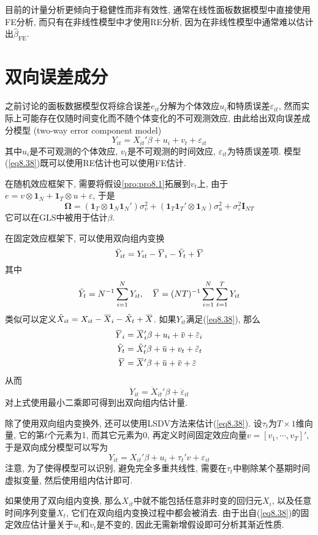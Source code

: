 \documentclass[cn, 12pt, math=mtpro2, bibstyle=apa, blue, twocol]{elegantbook}
\newcommand{\hb}{\hat{\beta}}
\newcommand{\OX}{\overbar{X}}
\newcommand{\BO}{\mathbold{\Omega}}
\newcommand{\overbar}[1]{\mkern 1.5mu\overline{\mkern-1.5mu#1\mkern-1.5mu}\mkern 1.5mu}
\begin{document}
目前的计量分析更倾向于稳健性而非有效性, 通常在线性面板数据模型中直接使用FE分析, 而只有在非线性模型中才使用RE分析, 因为在非线性模型中通常难以估计出$\hb_{\text{FE}}$.
\section{双向误差成分}
之前讨论的面板数据模型仅将综合误差$e_{it}$分解为个体效应$u_i$和特质误差$\varepsilon_{it}$, 然而实际上可能存在仅随时间变化而不随个体变化的不可观测效应, 由此给出双向误差成分模型 (two-way error component model)
\begin{equation}\label{eq8.38}
  Y_{it}=X_{it}'\beta+u_i+v_t+\varepsilon_{it}
\end{equation}
其中$u_i$是不可观测的个体效应, $v_t$是不可观测的时间效应, $\varepsilon_{it}$为特质误差项. 模型(\ref{eq8.38})既可以使用RE估计也可以使用FE估计.

在随机效应框架下, 需要将假设\ref{pro:pro8.1}拓展到$v_t$上, 由于$e=v\otimes \mathbf{1}_N+\mathbf{1}_T\otimes u+\varepsilon$, 于是
$$\BO=(\mathbf{1}_T\otimes \mathbf{1}_N\mathbf{1}_N')\sigma_v^2+(\mathbf{1}_T\mathbf{1}_T'\otimes\mathbf{1}_N)\sigma_u^2+\sigma_\varepsilon^2\mathbf{I}_{NT}$$
它可以在GLS中被用于估计$\beta$.

在固定效应框架下, 可以使用双向组内变换
$$\ddot{Y}_{it}=Y_{it}-\overbar{Y}_i-\tilde{Y}_t+\overbar{Y}$$
其中
$$\tilde{Y}_t=N^{-1}\sum_{i=1}^{N}Y_{it},\quad \overbar{Y}=(NT)^{-1}\sum_{i=1}^{N}\sum_{t=1}^{T}Y_{it}$$
类似可以定义$\ddot{X}_{it}=X_{it}-\overbar{X}_i-\tilde{X}_t+\overbar{X}$. 如果$Y_{it}$满足(\ref{eq8.38}), 那么
\begin{align*}
\overbar{Y}_i&=\OX_i'\beta+u_i+\overbar{v}+\overbar{\varepsilon}_i \\
\tilde{Y}_t&=\tilde{X}_t'\beta+\overbar{u}+v_t+\tilde{\varepsilon}_t \\
\overbar{Y}&=\OX'\beta+\overbar{u}+\overbar{v}+\overbar{\varepsilon}
\end{align*}
从而
$$\ddot{Y}_{it}=\ddot{X}_{it}'\beta+\ddot{\varepsilon}_{it}$$
\nocite{abadie2023should}
对上式使用最小二乘即可得到出双向组内估计量.

除了使用双向组内变换外, 还可以使用LSDV方法来估计(\ref{eq8.38}). 设$\tau_t$为$T\times1$维向量, 它的第$t$个元素为1, 而其它元素为0, 再定义时间固定效应向量$v=[v_1,\cdots,v_T]'$, 于是双向成分模型可以写为
$$Y_{it}=X_{it}'\beta+u_i+\tau_t'v+\varepsilon_{it}$$
注意, 为了使得模型可以识别, 避免完全多重共线性, 需要在$\tau_t$中剔除某个基期时间虚拟变量, 然后使用组内估计即可.

如果使用了双向组内变换, 那么$X_{it}$中就不能包括任意非时变的回归元$X_i$, 以及任意时间序列变量$X_t$, 它们在双向组内变换过程中都会被消去. 由于出自(\ref{eq8.38})的固定效应估计量关于$u_i$和$v_t$是不变的, 因此无需新增假设即可分析其渐近性质.
\end{document}
